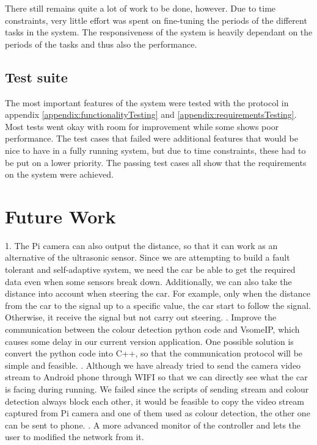 \documentclass[11pt, titlepage]{article} %
\begin{document}
There still remains quite a lot of work to be done, however. Due to time constraints, very little effort was
spent on fine-tuning the periods of the different tasks in the system. The responsiveness of the system is
heavily dependant on the periods of the tasks and thus also the performance.

\subsection{Test suite}
The most important features of the system were tested with the protocol in appendix \ref{appendix:functionalityTesting} and \ref{appendix:requirementsTesting}. Most tests went okay with room for improvement while some shows poor performance. The test cases that failed were additional features that would be nice to have in a fully running system, but due to time constraints, these had to be put on a lower priority. The passing test cases all show that the requirements on the system were achieved.



\clearpage
\section{Future Work}
1.	The Pi camera can also output the distance, so that it can work as an alternative of the ultrasonic sensor. Since we are attempting to build a fault tolerant and self-adaptive system, we need the car be able to get the required data even when some sensors break down. Additionally, we can also take the distance into account when steering the car. For example, only when the distance from the car to the signal up to a specific value, the car start to follow the signal. Otherwise, it receive the signal but not carry out steering.
.	Improve the communication between the colour detection python code and VsomeIP, which causes some delay in our current version application. One possible solution is convert the python code into C++, so that the communication protocol will be simple and feasible.
.	Although we have already tried to send the camera video stream to Android phone through WIFI so that we can directly see what the car is facing during running. We failed since the scripts of sending stream and colour detection always block each other, it would be feasible to copy the video stream captured from Pi camera and one of them used as colour detection, the other one can be sent to phone.
. A more advanced monitor of the controller and lets the user to modified the network from it. 
\clearpage
\end{document}
